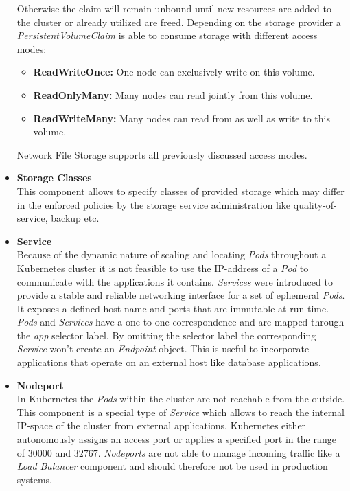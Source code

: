 \begin{itemize}
{    Otherwise the claim will remain unbound until new resources are added to the cluster or already utilized are freed.
    Depending on the storage provider a \textit{PersistentVolumeClaim} is able to consume storage with different access modes:
    \begin{itemize}
        \item[] {\textbf{ReadWriteOnce:} One node can exclusively write on this volume.}
        \item[] {\textbf{ReadOnlyMany:} Many nodes can read jointly from this volume.}
        \item[] {\textbf{ReadWriteMany:} Many nodes can read from as well as write to this volume.}
    \end{itemize}
    Network File Storage supports all previously discussed access modes.
    }
    \item[]{\textbf{Storage Classes}\\
    This component allows to specify classes of provided storage which may differ in the enforced policies by the storage service administration like quality-of-service, backup etc.
    }
    \item[]{\textbf{Service}\\
    Because of the dynamic nature of scaling and locating \textit{Pods} throughout a Kubernetes cluster it is not feasible to use the IP-address of a \textit{Pod} to communicate with the applications it contains.
    \textit{Services} were introduced to provide a stable and reliable networking interface for a set of ephemeral \textit{Pods}.
    It exposes a defined host name and ports that are immutable at run time.
    \textit{Pods} and \textit{Services} have a one-to-one correspondence and are mapped through the \textit{app} selector label.
    By omitting the selector label the corresponding \textit{Service} won't create an \textit{Endpoint} object.
    This is useful to incorporate applications that operate on an external host like database applications.
    }
    \item[]{\textbf{Nodeport}\\
    In Kubernetes the \textit{Pods} within the cluster are not reachable from the outside.
    This component is a special type of \textit{Service} which allows to reach the internal IP-space of the cluster from external applications.
    Kubernetes either autonomously assigns an access port or applies a specified port in the range of $30000$ and $32767$.
    \textit{Nodeports} are not able to manage incoming traffic like a \textit{Load Balancer} component and should therefore not be used in production systems.
}
\end{itemize}
